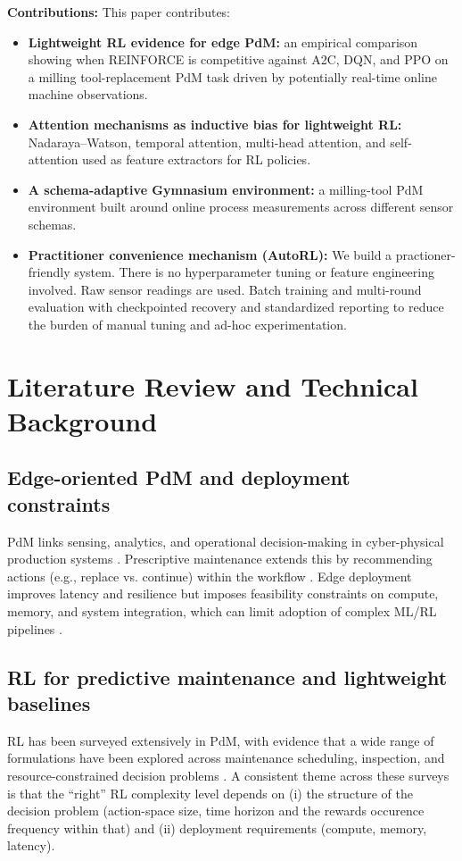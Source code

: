 \documentclass[sn-basic]{sn-jnl} %
\begin{document}
\textbf{Contributions:}
This paper contributes:
\begin{itemize}
	\item \textbf{Lightweight RL evidence for edge PdM:} an empirical comparison showing when \textsc{REINFORCE} is competitive against \textsc{A2C}, \textsc{DQN}, and \textsc{PPO} on a milling tool-replacement PdM task driven by potentially real-time online machine observations.
	\item \textbf{Attention mechanisms as inductive bias for lightweight RL:} Nadaraya--Watson, temporal attention, multi-head attention, and self-attention used as feature extractors for RL policies.
	\item \textbf{A schema-adaptive Gymnasium environment:} a milling-tool PdM environment built around online process measurements across different sensor schemas.
	\item \textbf{Practitioner convenience mechanism (AutoRL):} We build a practioner-friendly system. There is no hyperparameter tuning or feature engineering involved. Raw sensor readings are used. Batch training and multi-round evaluation with checkpointed recovery and standardized reporting to reduce the burden of manual tuning and ad-hoc experimentation.
\end{itemize}

\section{Literature Review and Technical Background}
\label{sec:lit_tech}
\subsection{Edge-oriented PdM and deployment constraints}
PdM links sensing, analytics, and operational decision-making in cyber-physical production systems \cite{Compare2020, Zonta2020}. Prescriptive maintenance extends this by recommending actions (e.g., replace vs. continue) within the workflow \cite{Ansari2019}. Edge deployment improves latency and resilience but imposes feasibility constraints on compute, memory, and system integration, which can limit adoption of complex ML/RL pipelines \cite{Njor2024, Pandey2023}.

\subsection{RL for predictive maintenance and lightweight baselines}
RL has been surveyed extensively in PdM, with evidence that a wide range of formulations have been explored across maintenance scheduling, inspection, and resource-constrained decision problems \cite{Siraskar2023, Ogunfowora2023, Zhang2024}. A consistent theme across these surveys is that the ``right'' RL complexity level depends on (i) the structure of the decision problem (action-space size, time horizon and the rewards occurence frequency within that) and (ii) deployment requirements (compute, memory, latency).
\end{document}
